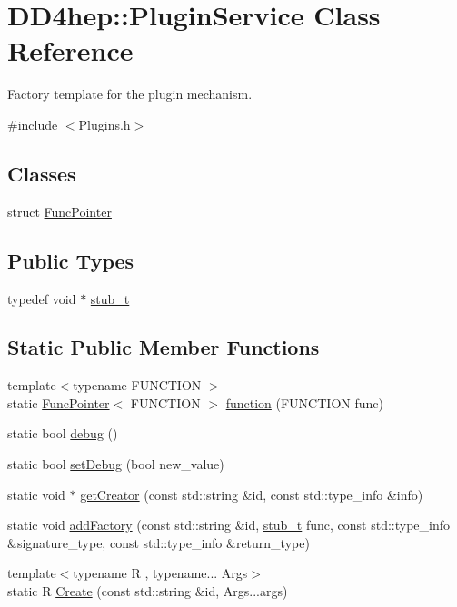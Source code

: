 \hypertarget{class_d_d4hep_1_1_plugin_service}{
\section{DD4hep::PluginService Class Reference}
\label{class_d_d4hep_1_1_plugin_service}
}


Factory template for the plugin mechanism.  


{\ttfamily \#include $<$Plugins.h$>$}\subsection*{Classes}
\begin{DoxyCompactItemize}
\item 
struct \hyperlink{struct_d_d4hep_1_1_plugin_service_1_1_func_pointer}{FuncPointer}
\end{DoxyCompactItemize}
\subsection*{Public Types}
\begin{DoxyCompactItemize}
\item 
typedef void $\ast$ \hyperlink{class_d_d4hep_1_1_plugin_service_aa370cd45b770eaabf326eeaa91019382}{stub\_\-t}
\end{DoxyCompactItemize}
\subsection*{Static Public Member Functions}
\begin{DoxyCompactItemize}
\item 
{\footnotesize template$<$typename FUNCTION $>$ }\\static \hyperlink{struct_d_d4hep_1_1_plugin_service_1_1_func_pointer}{FuncPointer}$<$ FUNCTION $>$ \hyperlink{class_d_d4hep_1_1_plugin_service_aa18d81d33b408245a85fc5fe36a5a607}{function} (FUNCTION func)
\item 
static bool \hyperlink{class_d_d4hep_1_1_plugin_service_a90761f21b553c0285eff00839dd912e8}{debug} ()
\item 
static bool \hyperlink{class_d_d4hep_1_1_plugin_service_a54147a8801746a0304f8b6c63aa0e083}{setDebug} (bool new\_\-value)
\item 
static void $\ast$ \hyperlink{class_d_d4hep_1_1_plugin_service_a63fcd240235468c6408563b0057c82df}{getCreator} (const std::string \&id, const std::type\_\-info \&info)
\item 
static void \hyperlink{class_d_d4hep_1_1_plugin_service_a55973b500e0191d1e843b7db9cfd37eb}{addFactory} (const std::string \&id, \hyperlink{class_d_d4hep_1_1_plugin_service_aa370cd45b770eaabf326eeaa91019382}{stub\_\-t} func, const std::type\_\-info \&signature\_\-type, const std::type\_\-info \&return\_\-type)
\item 
{\footnotesize template$<$typename R , typename... Args$>$ }\\static R \hyperlink{class_d_d4hep_1_1_plugin_service_a872e355f59bbe197c0b61c6f0571f8c8}{Create} (const std::string \&id, Args...args)
\end{DoxyCompactItemize}


